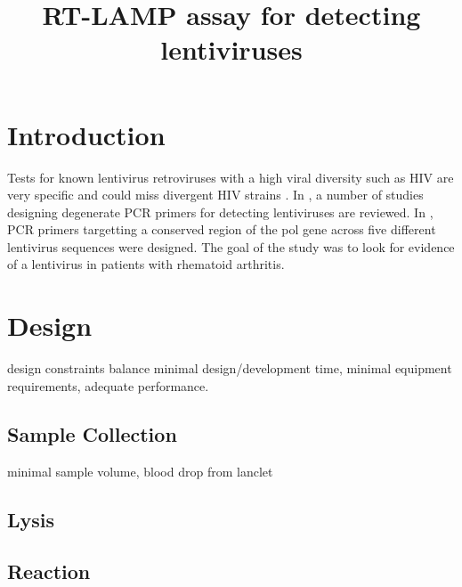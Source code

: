 \documentclass{article}
\title{RT-LAMP assay for detecting lentiviruses}
\begin{document}
\maketitle

\section{Introduction}

Tests for known lentivirus retroviruses with a high viral diversity such as HIV are very specific and could miss divergent HIV strains \cite{bartolo2012hiv}\cite{luft2011hiv}. In \cite{voisset2008human}, a number of studies designing degenerate PCR primers for detecting lentiviruses are reviewed. In \cite{giovine1994absence}, PCR primers targetting a conserved region of the pol gene across five different lentivirus sequences were designed. The goal of the study was to look for evidence of a lentivirus in patients with rhematoid arthritis. 


\section{Design}

design constraints balance minimal design/development time, minimal equipment requirements, adequate performance.

\subsection{Sample Collection}

minimal sample volume, blood drop from lanclet 

\subsection{Lysis}

\cite{curtis2008rapid}

\subsection{Reaction}





\end{document}
